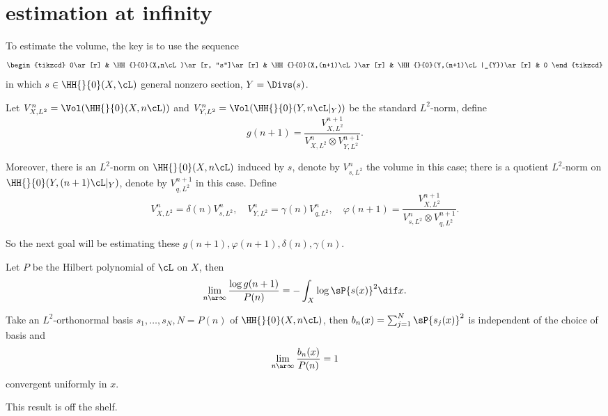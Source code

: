 \section{estimation at infinity}

\begin{mtv}
  To estimate the volume, the key is to use the sequence
  \[
    \begin{tikzcd}
      0\ar[r] & \HH{}{0}(X,n\cL)\ar[r, "s"]\ar[r] & \HH{}{0}(X,(n+1)\cL)\ar[r] & \HH{}{0}(Y,(n+1)\cL|_{Y})\ar[r] & 0
    \end{tikzcd}
  \]
  in which $s\in\HH{}{0}(X,\cL)$ general nonzero section, $Y=\Divs(s)$.

\end{mtv}

\begin{dfn}
  Let $V_{X,L^{2}}^{n}=\Vol(\HH{}{0}(X,n\cL))$ and $V_{Y,L^{2}}^{n}=\Vol(\HH{}{0}(Y,n\cL|_{Y}))$ be the standard $L^{2}$-norm, define
  \[
    g(n+1)=\frac{V_{X,L^{2}}^{n+1}}{V_{X,L^{2}}^{n}\otimes V_{Y,L^{2}}^{n+1}}.
  \]

  Moreover, there is an $L^{2}$-norm on $\HH{}{0}(X,n\cL)$ induced by $s$, denote by $V_{s,L^{2}}^{n}$ the volume in this case; there is a quotient $L^{2}$-norm on $\HH{}{0}(Y,(n+1)\cL|_{Y})$, denote by $V_{q,L^{2}}^{n+1}$ in this case. Define
  \[
    V_{X,L^{2}}^{n}=\delta(n)V_{s,L^{2}}^{n},\quad V_{Y,L^{2}}^{n}=\gamma(n)V_{q,L^{2}}^{n},\quad\varphi(n+1)=\frac{V_{X,L^{2}}^{n+1}}{V_{s,L^{2}}^{n}\otimes V_{q,L^{2}}^{n+1}}.
  \]
\end{dfn}
\begin{rmk}
  So the next goal will be estimating these $g(n+1), \varphi(n+1), \delta(n), \gamma(n)$.
\end{rmk}


\begin{prp}\label{prp:estG}
  Let $P$ be the Hilbert polynomial of $\cL$ on $X$, then
  \[
    \lim_{n\ar\infty}\frac{\log g(n+1)}{P(n)}=-\int_{X}\log\sP{s(x)}^{2}\dif x.
  \]
\end{prp}

\begin{prp}
  Take an $L^{2}$-orthonormal basis $s_{1},\ldots,s_{N}, N=P(n)$ of $\HH{}{0}(X,n\cL)$, then $b_{n}(x)=\sum_{j=1}^{N}\sP{s_{j}(x)}^{2}$ is independent of the choice of basis and
  \[
    \lim_{n\ar\infty}\frac{b_{n}(x)}{P(n)}=1
  \]
  convergent uniformly in $x$.
\end{prp}
\begin{rmk}
  This result is off the shelf.
\end{rmk}


